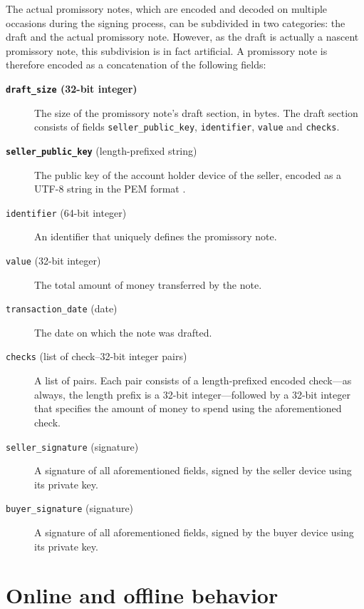 \documentclass[12pt,a4paper]{article}
\begin{document}
\begin{multicols}{2}
 The actual promissory notes, which are encoded and decoded on multiple occasions during the signing process, can be subdivided in two categories: the draft and the actual promissory note. However, as the draft is actually a nascent promissory note, this subdivision is in fact artificial. A promissory note is therefore encoded as a concatenation of the following fields:
 
	 \begin{description}
	 	\item[\textbf{\texttt{draft\_size} (32-bit integer)}] The size of the promissory note's draft section, in bytes. The draft section consists of fields \texttt{seller\_public\_key}, \texttt{identifier}, \texttt{value} and \texttt{checks}.
	 	
		\item[\textbf{\texttt{seller\_public\_key}} (length-prefixed string)]  The public key of the account holder device of the seller, encoded as a UTF-8 string in the PEM format \cite{rfc-pem}.

		\item[\texttt{identifier} (64-bit integer)] An identifier that uniquely defines the promissory note.

		\item[\texttt{value} (32-bit integer)] The total amount of money transferred by the note.
		
		\item[\texttt{transaction\_date} (date)] The date on which the note was drafted.

		\item[\texttt{checks} (list of check--32-bit integer pairs)] A list of pairs. Each pair consists of a length-prefixed encoded check---as always, the length prefix is a 32-bit integer---followed by a 32-bit integer that specifies the amount of money to spend using the aforementioned check.

		\item[\texttt{seller\_signature} (signature)] A signature of all aforementioned fields, signed by the seller device using its private key.
		
		\item[\texttt{buyer\_signature} (signature)] A signature of all aforementioned fields, signed by the buyer device using its private key.
	\end{description}
 
  

	\section{Online and offline behavior}


\end{multicols}
\end{document}
